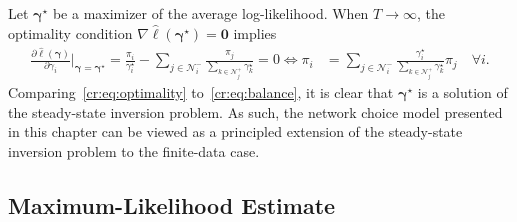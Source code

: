 Let $\bm{\gamma}^\star$ be a maximizer of the average log-likelihood.
When $T \to \infty$, the optimality condition $\nabla \hat{\ell} (\bm{\gamma}^\star) = \bm{0}$ implies
\begin{align}
\frac{\partial \hat{\ell}(\bm{\gamma})}{\partial \gamma_i} \bigg|_{\bm{\gamma} = \bm{\gamma}^\star}
    = \frac{\pi_i}{\gamma^\star_i} - \sum_{j \in \mathcal{N}^-_i} \frac{\pi_j}{\sum_{k \in \mathcal{N}^+_j} \gamma^\star_k} = 0
    \iff \pi_i &= \sum_{j \in \mathcal{N}^-_i} \frac{\gamma^\star_i}{\sum_{k \in \mathcal{N}^+_j} \gamma^\star_k} \pi_j \quad \forall i. \label{cr:eq:optimality}
\end{align}
Comparing~\eqref{cr:eq:optimality} to~\eqref{cr:eq:balance}, it is clear that $\bm{\gamma}^\star$ is a solution of the steady-state inversion problem.
As such, the network choice model presented in this chapter can be viewed as a principled extension of the steady-state inversion problem to the finite-data case.


\subsection{Maximum-Likelihood Estimate}
\label{cr:sec:maxlik}

